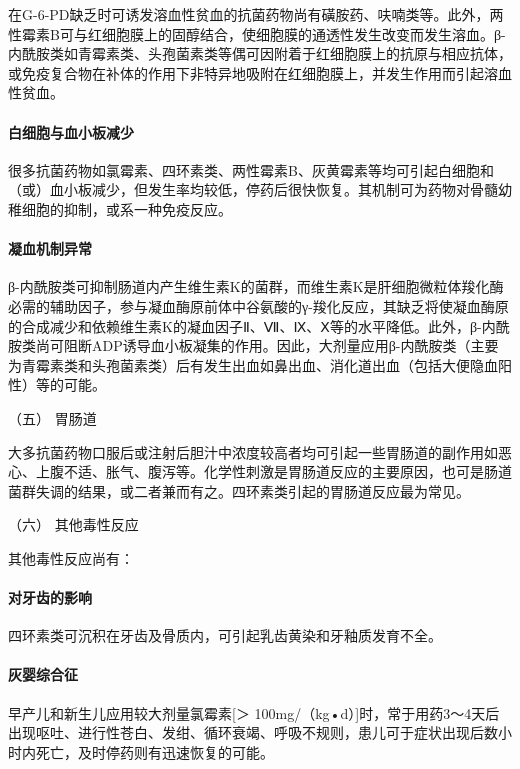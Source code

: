 在G-6-PD缺乏时可诱发溶血性贫血的抗菌药物尚有磺胺药、呋喃类等。此外，两性霉素B可与红细胞膜上的固醇结合，使细胞膜的通透性发生改变而发生溶血。β-内酰胺类如青霉素类、头孢菌素类等偶可因附着于红细胞膜上的抗原与相应抗体，或免疫复合物在补体的作用下非特异地吸附在红细胞膜上，并发生作用而引起溶血性贫血。

\paragraph{白细胞与血小板减少}

很多抗菌药物如氯霉素、四环素类、两性霉素B、灰黄霉素等均可引起白细胞和（或）血小板减少，但发生率均较低，停药后很快恢复。其机制可为药物对骨髓幼稚细胞的抑制，或系一种免疫反应。

\paragraph{凝血机制异常}

β-内酰胺类可抑制肠道内产生维生素K的菌群，而维生素K是肝细胞微粒体羧化酶必需的辅助因子，参与凝血酶原前体中谷氨酸的γ-羧化反应，其缺乏将使凝血酶原的合成减少和依赖维生素K的凝血因子Ⅱ、Ⅶ、Ⅸ、Ⅹ等的水平降低。此外，β-内酰胺类尚可阻断ADP诱导血小板凝集的作用。因此，大剂量应用β-内酰胺类（主要为青霉素类和头孢菌素类）后有发生出血如鼻出血、消化道出血（包括大便隐血阳性）等的可能。

\hypertarget{text00436.htmlux5cux23CHP17-7-7-1-5}{}
（五） 胃肠道

大多抗菌药物口服后或注射后胆汁中浓度较高者均可引起一些胃肠道的副作用如恶心、上腹不适、胀气、腹泻等。化学性刺激是胃肠道反应的主要原因，也可是肠道菌群失调的结果，或二者兼而有之。四环素类引起的胃肠道反应最为常见。

\hypertarget{text00436.htmlux5cux23CHP17-7-7-1-6}{}
（六） 其他毒性反应

其他毒性反应尚有：

\paragraph{对牙齿的影响}

四环素类可沉积在牙齿及骨质内，可引起乳齿黄染和牙釉质发育不全。

\paragraph{灰婴综合征}

早产儿和新生儿应用较大剂量氯霉素{[}＞
100mg/（kg•d）{]}时，常于用药3～4天后出现呕吐、进行性苍白、发绀、循环衰竭、呼吸不规则，患儿可于症状出现后数小时内死亡，及时停药则有迅速恢复的可能。

